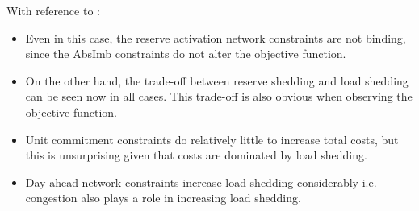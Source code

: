 \documentclass[number,times]{elsarticle}
\begin{document}
With reference to :

\begin{itemize}
    \item Even in this case, the reserve activation network constraints are not binding, since the AbsImb constraints do not alter the objective function.
    \item On the other hand, the trade-off between reserve shedding and load shedding can be seen now in all cases. This trade-off is also obvious when observing the objective function.
    \item Unit commitment constraints do relatively little to increase total costs, but this is unsurprising given that costs are dominated by load shedding.
    \item Day ahead network constraints increase load shedding considerably i.e. congestion also plays a role in increasing load shedding.
\end{itemize}


\end{document}
